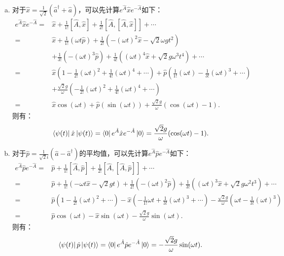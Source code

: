 \documentclass[reqno,a4paper,12pt]{amsart}
\begin{document}
\begin{tcolorbox}[breakable, colback = black!5!white, colframe = black]
\begin{enumerate}[(a)]
\item 对于$\hat{x} = \frac{1}{\sqrt{2}}(\hat{a}^\dagger+\hat{a})$，可以先计算$e^{\hat{A}} \hat{x} e^{-\hat{A}}$如下：
\begin{align*}
	e^{\hat{A}} \hat{x} e^{-\hat{A}} =& \hat{x} + \frac{1}{1!}[\hat{A}, \hat{x}] + \frac{1}{2!}[\hat{A}, [\hat{A},\hat{x}]] + \cdots \\
	=& \hat{x} + \frac{1}{1!}(\omega t \hat{p}) + \frac{1}{2!}(-(\omega t)^2 \hat{x} - \sqrt{2}\omega g t^2) \\
	&+ \frac{1}{3!}(-(\omega t)^3 \hat{p}) + \frac{1}{4!}((\omega t)^4 \hat{x} + \sqrt{2}g\omega^3t^4) + \cdots \\
	=& \hat{x}\left(1 - \frac{1}{2!}(\omega t)^2 + \frac{1}{4!}(\omega t)^4 + \cdots \right) + \hat{p} \left( \frac{1}{1!}(\omega t) - \frac{1}{3!}(\omega t)^3 + \cdots \right) \\
	&+ \frac{\sqrt{2}g}{\omega} \left( -\frac{1}{2!}(\omega t)^2 + \frac{1}{4!}(\omega t)^4 + \cdots \right) \\
	=& \hat{x} \cos(\omega t) + \hat{p} (\sin(\omega t)) + \frac{\sqrt{2}g}{\omega}(\cos(\omega t) - 1).
\end{align*}
则有：
\[
	\bra{\psi(t)} \hat{x} \ket{\psi(t)} = \bra{0} e^{\hat{A}} \hat{x} e^{-\hat{A}} \ket{0} = \frac{\sqrt{2}g}{\omega}(\cos(\omega t) - 1).
\]

\item 对于$\hat{p} = \frac{1}{\sqrt{2}i}(\hat{a}-\hat{a}^\dagger)$的平均值，可以先计算$e^{\hat{A}} \hat{p} e^{-\hat{A}}$如下：
\begin{align*}
	e^{\hat{A}} \hat{p} e^{-\hat{A}} =& \hat{p} + \frac{1}{1!}[\hat{A}, \hat{p}] + \frac{1}{2!}[\hat{A}, [\hat{A}, \hat{p}]] + \cdots \\
	=& \hat{p} + \frac{1}{1!}(-\omega t \hat{x} - \sqrt{2}gt) + \frac{1}{2!}(-(\omega t)^2 \hat{p}) + \frac{1}{3!}((\omega t)^3 \hat{x} + \sqrt{2}g\omega^2t^3) + \cdots \\
	=& \hat{p} \left( 1-\frac{1}{2!}(\omega t)^2+\cdots \right) - \hat{x}\left( -\frac{1}{1!}\omega t + \frac{1}{3!}(\omega t)^3 + \cdots \right) - \frac{\sqrt{2}g}{\omega}\left( \omega t - \frac{1}{3!}(\omega t)^3 \right) \\
	=& \hat{p} \cos(\omega t) - \hat{x} \sin(\omega t) - \frac{\sqrt{2}g}{\omega} \sin(\omega t).
\end{align*}
则有：
\[
	\bra{\psi(t)} \hat{p} \ket{\psi(t)} = \bra{0} e^{\hat{A}} \hat{p} e^{-\hat{A}} \ket{0} = -\frac{\sqrt{2}g}{\omega}\sin(\omega t).
\]
\end{enumerate}


\end{tcolorbox}
\end{document}
